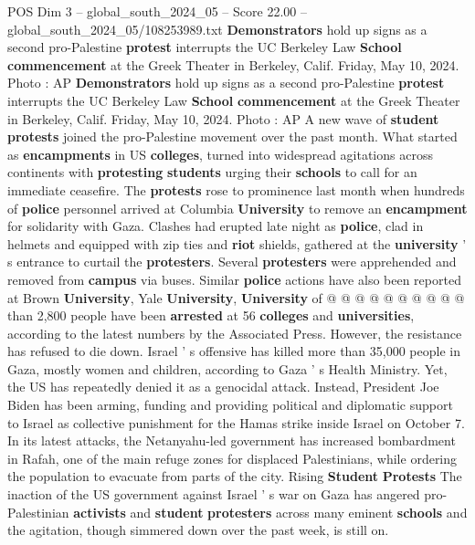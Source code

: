 \begin{textsample}{POS Dim 3 – global\_south\_2024\_05 – Score 22.00 – global\_south\_2024\_05/108253989.txt}  \label{ex:f3_pos_105}
\textbf{Demonstrators} hold up signs as a second pro-Palestine \textbf{protest} interrupts the UC Berkeley Law \textbf{School} \textbf{commencement} at the Greek Theater in Berkeley, Calif.
Friday, May 10, 2024.
Photo : AP \textbf{Demonstrators} hold up signs as a second pro-Palestine \textbf{protest} interrupts the UC Berkeley Law \textbf{School} \textbf{commencement} at the Greek Theater in Berkeley, Calif.
Friday, May 10, 2024.
Photo : AP A new wave of \textbf{student} \textbf{protests} joined the pro-Palestine movement over the past month.
What started as \textbf{encampments} in US \textbf{colleges}, turned into widespread agitations across continents with \textbf{protesting} \textbf{students} urging their \textbf{schools} to call for an immediate ceasefire.
The \textbf{protests} rose to prominence last month when hundreds of \textbf{police} personnel arrived at Columbia \textbf{University} to remove an \textbf{encampment} for solidarity with Gaza.
Clashes had erupted late night as \textbf{police}, clad in helmets and equipped with zip ties and \textbf{riot} shields, gathered at the \textbf{university} ' s entrance to curtail the \textbf{protesters}.
Several \textbf{protesters} were apprehended and removed from \textbf{campus} via buses.
Similar \textbf{police} actions have also been reported at Brown \textbf{University}, Yale \textbf{University}, \textbf{University} of @ @ @ @ @ @ @ @ @ @ than 2,800 people have been \textbf{arrested} at 56 \textbf{colleges} and \textbf{universities}, according to the latest numbers by the Associated Press.
However, the resistance has refused to die down.
Israel ' s offensive has killed more than 35,000 people in Gaza, mostly women and children, according to Gaza ' s Health Ministry.
Yet, the US has repeatedly denied it as a genocidal attack.
Instead, President Joe Biden has been arming, funding and providing political and diplomatic support to Israel as collective punishment for the Hamas strike inside Israel on October 7.
In its latest attacks, the Netanyahu-led government has increased bombardment in Rafah, one of the main refuge zones for displaced Palestinians, while ordering the population to evacuate from parts of the city.
Rising \textbf{Student} \textbf{Protests} The inaction of the US government against Israel ' s war on Gaza has angered pro-Palestinian \textbf{activists} and \textbf{student} \textbf{protesters} across many eminent \textbf{schools} and the agitation, though simmered down over the past week, is still on.

\end{textsample}
